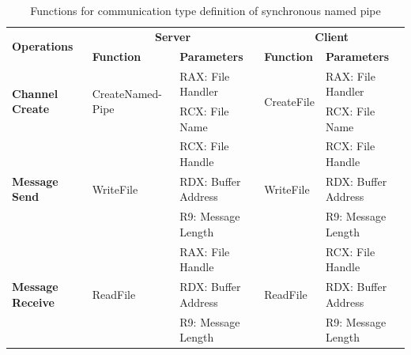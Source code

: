     \begin{table}[h]
        \centering
        \caption{Functions for communication type definition of synchronous named pipe}
        \label{synfunctions}
        \begin{tabular}{|l|l|l|l|l|}
            \hline
             \multirow{2}{*}{\textbf{Operations}} &
               \multicolumn{2}{c|}{\textbf{Server}} &
               \multicolumn{2}{c|}{\textbf{Client}} \\
             \cline{2-5}
              & \textbf{Function}& \textbf{Parameters} & \textbf{Function} & \textbf{Parameters}  \\
             \hline
             \multirow{2}{*}{\parbox{1.8cm}{\textbf{Channel Create}}}
             &\multirow{2}{*}{\parbox{2.5cm}{CreateNamed- Pipe}} &  RAX: File Handler & \multirow{2}{*}{CreateFile} &  RAX: File Handler\\
              \cline{3-3} \cline{5-5}
             &&  RCX: File Name &  &  RCX: File Name\\
            \hline
             \multirow{3}{*}{\parbox{1.8cm}{\textbf{Message Send}}}
             &\multirow{3}{*}{WriteFile} &  RCX: File Handle & \multirow{3}{*}{WriteFile} &  RCX: File Handle\\
              \cline{3-3} \cline{5-5}
             &&  RDX: Buffer Address &  &  RDX: Buffer Address\\
                           \cline{3-3} \cline{5-5}
             & &  R9: Message Length &  &  R9: Message Length\\
            \hline
            \multirow{3}{*}{\parbox{1.8cm}{\textbf{Message Receive}}}
             & \multirow{3}{*}{ReadFile}&  RAX: File Handle & \multirow{3}{*}{ReadFile} &  RCX: File Handle\\
              \cline{3-3} \cline{5-5}
              &&  RDX: Buffer Address &  &  RDX: Buffer Address\\
                           \cline{3-3} \cline{5-5}
             & &  R9: Message Length &  &  R9: Message Length\\
            \hline
        \end{tabular}
    \end{table}
